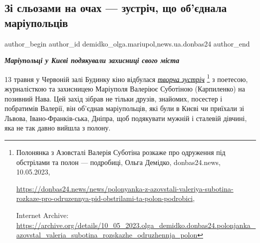 
 
 
 
 
 
\subsection{Зі сльозами на очах — зустріч, що об'єднала маріупольців}
\label{sec:16_05_2023.stz.news.ua.donbas24.1.zi_sljozamy_na_ochah_zustrich_objednala_mrplciv}
 
\ifcmt
 author_begin
   author_id demidko_olga.mariupol,news.ua.donbas24
 author_end
\fi

\begin{center}
  \em\color{blue}\bfseries\Large
  Маріупольці у Києві подякували захисниці свого міста
\end{center}

13 травня у Червоній залі Будинку кіно відбулася \href{https://archive.org/details/10_05_2023.olga_demidko.donbas24.polonjanka_azovstal_valeria_subotina_rozskazhe_odruzhennja_polon}{\emph{творча зустріч}}%
\footnote{Полонянка з Азовсталі Валерія Суботіна розкаже про одруження під обстрілами та полон — подробиці, Ольга Демідко, donbas24.news, 10.05.2023, \par%
\url{https://donbas24.news/news/polonyanka-z-azovstali-valeriya-subotina-rozkaze-pro-odruzennya-pid-obstrilami-ta-polon-podrobici}, \par%
Internet Archive: \url{https://archive.org/details/10_05_2023.olga_demidko.donbas24.polonjanka_azovstal_valeria_subotina_rozskazhe_odruzhennja_polon}%
} з поетесою, журналісткою та захисницею Маріуполя Валеріює Суботіною (Карпиленко) на
позивний Нава. Цей захід зібрав не тільки друзів, знайомих, посестер і
побратимів Валерії, він об'єднав маріупольців, які були в Києві чи приїхали зі
Львова, Івано-Франків\hyp{}ська, Дніпра, щоб подякувати мужній і сталевій дівчині,
яка не так давно вийшла з полону.

